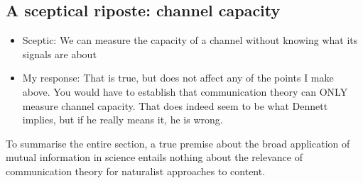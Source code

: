 \subsection{A sceptical riposte: channel capacity}



\begin{itemize}
    \item Sceptic: We can measure the capacity of a channel without knowing what its signals are about
    \item My response: That is true, but does not affect any of the points I make above. You would have to establish that communication theory can ONLY measure channel capacity. That does indeed seem to be what Dennett implies, but if he really means it, he is wrong.
\end{itemize}

To summarise the entire section, a true premise about the broad application of mutual information in science entails nothing about the relevance of communication theory for naturalist approaches to content.
